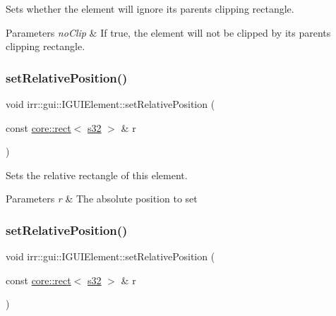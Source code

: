 Sets whether the element will ignore its parent\textquotesingle{}s clipping rectangle. 


\begin{DoxyParams}{Parameters}
{\em no\+Clip} & If true, the element will not be clipped by its parent\textquotesingle{}s clipping rectangle. \\
\hline
\end{DoxyParams}
\mbox{\label{classirr_1_1gui_1_1IGUIElement_a0e5bb2d0a2e88e30d3697652f8dd7034}} 
\subsubsection{\texorpdfstring{set\+Relative\+Position()}{setRelativePosition()}\hspace{0.1cm}{\footnotesize\ttfamily [1/4]}}
{\footnotesize\ttfamily void irr\+::gui\+::\+I\+G\+U\+I\+Element\+::set\+Relative\+Position (\begin{DoxyParamCaption}\item[{const \hyperlink{classirr_1_1core_1_1rect}{core\+::rect}$<$ \hyperlink{namespaceirr_ac66849b7a6ed16e30ebede579f9b47c6}{s32} $>$ \&}]{r }\end{DoxyParamCaption})\hspace{0.3cm}{\ttfamily [inline]}}



Sets the relative rectangle of this element. 


\begin{DoxyParams}{Parameters}
{\em r} & The absolute position to set \\
\hline
\end{DoxyParams}
\mbox{\label{classirr_1_1gui_1_1IGUIElement_a0e5bb2d0a2e88e30d3697652f8dd7034}} 
\subsubsection{\texorpdfstring{set\+Relative\+Position()}{setRelativePosition()}\hspace{0.1cm}{\footnotesize\ttfamily [2/4]}}
{\footnotesize\ttfamily void irr\+::gui\+::\+I\+G\+U\+I\+Element\+::set\+Relative\+Position (\begin{DoxyParamCaption}\item[{const \hyperlink{classirr_1_1core_1_1rect}{core\+::rect}$<$ \hyperlink{namespaceirr_ac66849b7a6ed16e30ebede579f9b47c6}{s32} $>$ \&}]{r }\end{DoxyParamCaption})\hspace{0.3cm}{\ttfamily [inline]}}



